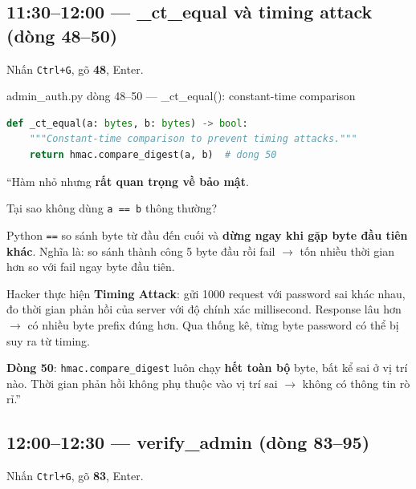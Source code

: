 \documentclass[12pt, a4paper]{article}
\begin{document}
\subsection{11:30--12:00 --- \_ct\_equal và timing attack (dòng 48--50)}

\begin{doact}
Nhấn \texttt{Ctrl+G}, gõ \textbf{48}, Enter.
\end{doact}

\begin{code}{admin\_auth.py dòng 48--50 --- \_ct\_equal(): constant-time comparison}
\begin{lstlisting}[language=Python, firstnumber=48]
def _ct_equal(a: bytes, b: bytes) -> bool:
    """Constant-time comparison to prevent timing attacks."""
    return hmac.compare_digest(a, b)  # dong 50
\end{lstlisting}
\end{code}

\begin{say}
``Hàm nhỏ nhưng \textbf{rất quan trọng về bảo mật}.

Tại sao không dùng \texttt{a == b} thông thường?

Python \texttt{==} so sánh byte từ đầu đến cuối và \textbf{dừng ngay khi gặp byte đầu tiên khác}.
Nghĩa là: so sánh thành công 5 byte đầu rồi fail $\to$ tốn nhiều thời gian hơn
so với fail ngay byte đầu tiên.

Hacker thực hiện \textbf{Timing Attack}:
gửi 1000 request với password sai khác nhau,
đo thời gian phản hồi của server với độ chính xác millisecond.
Response lâu hơn $\to$ có nhiều byte prefix đúng hơn.
Qua thống kê, từng byte password có thể bị suy ra từ timing.

\textbf{Dòng 50}: \texttt{hmac.compare\_digest} luôn chạy \textbf{hết toàn bộ} byte,
bất kể sai ở vị trí nào.
Thời gian phản hồi không phụ thuộc vào vị trí sai $\to$ không có thông tin rò rỉ.''
\end{say}

\subsection{12:00--12:30 --- verify\_admin (dòng 83--95)}

\begin{doact}
Nhấn \texttt{Ctrl+G}, gõ \textbf{83}, Enter.
\end{doact}
\end{document}
